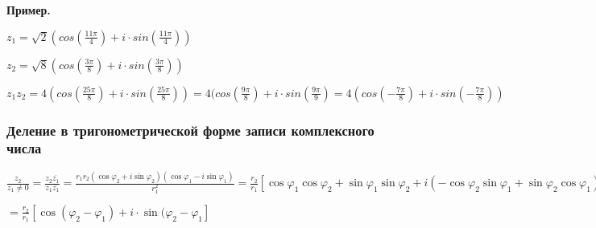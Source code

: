 \documentclass{article}
\begin{document}

    \textbf{Пример.}

    \( z_1 = \sqrt{2}(cos(\frac{11\pi}{4}) + i\cdot sin(\frac{11\pi}{4})) \)

    \( z_2 = \sqrt{8}(cos(\frac{3\pi}{8}) + i\cdot sin(\frac{3\pi}{8})) \)

    \( z_1z_2 = 4(cos(\frac{25\pi}{8}) + i\cdot sin(\frac{25\pi}{8})) = 4(cos(\frac{9\pi}{8}) + i\cdot sin(\frac{9\pi}{9}) = 4(cos(-\frac{7\pi}{8}) + i\cdot sin(-\frac{7\pi}{8})) \)
    
    \subsubsection{Деление в тригонометрической форме записи комплексного числа}

    \(\frac{z_2}{z_1 \neq 0} = \frac{z_2\overline{z_1}}{z_1\overline{z_1}} = \frac{r_1r_2(\cos\varphi_2+i\sin\varphi_2)(\cos\varphi_1-i\sin\varphi_1)}{r_1^2} = \frac{r_2}{r_1}[\cos\varphi_1\cos\varphi_2 + \sin\varphi_1\sin\varphi_2 + i(-\cos\varphi_2\sin\varphi_1 + \sin\varphi_2\cos\varphi_1)] =\)
    
    \( = \frac{r_2}{r_1}[ \cos(\varphi_2 - \varphi_1) + i\cdot \sin(\varphi_2 - \varphi_1 ]\)
\end{document}
